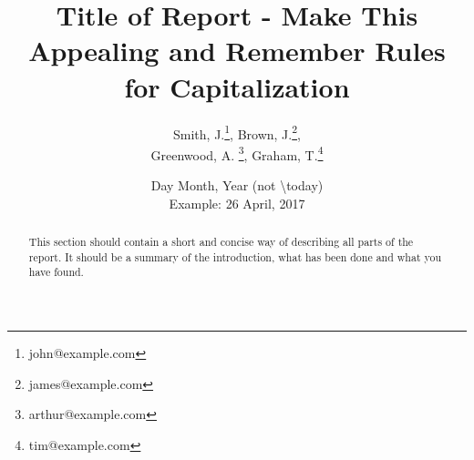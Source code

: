 \documentclass[11pt]{article}
\title{
    Title of Report - Make This Appealing and Remember Rules for Capitalization
    }
\author{
    Smith, J.\footnote{john@example.com}, Brown, J.\footnote{james@example.com}, \\
    Greenwood, A. \footnote{arthur@example.com}, Graham, T.\footnote{tim@example.com}
}
\date{
    Day Month, Year (not \textbackslash today)\\
    Example: 26 April, 2017
}
\begin{document}
\maketitle
\begin{abstract}
    This section should contain a short and concise way of describing all parts of the report. It should be a summary of the introduction, what has been done and what you have found.
\end{abstract}
\newpage
\tableofcontents
\newpage
{} %






\newpage


\appendix
{}



\end{document}
